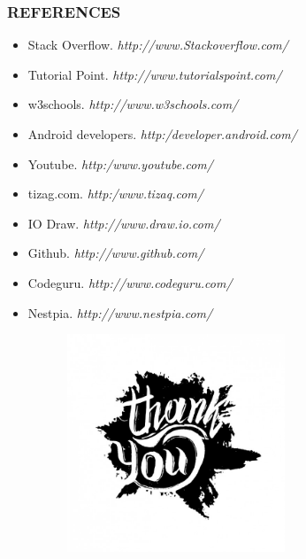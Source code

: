 \documentclass{beamer} %
\theoremstyle{definition} %
\begin{document}
\begin{frame}
\frametitle {REFERENCES}
\begin{itemize}

 \item Stack Overflow. \textit{http://www.Stackoverflow.com/}
 \item Tutorial Point. \textit{http://www.tutorialspoint.com/}
  \item w3schools.
  \textit{http://www.w3schools.com/}
   \item Android developers.
    \textit{http:/developer.android.com/}
    \item Youtube.
        \textit{http:/www.youtube.com/}
    \item tizag.com.
        \textit{http:/www.tizaq.com/}
        \item IO Draw. \textit{http://www.draw.io.com/}
        \item Github. \textit{http://www.github.com/}
        \item Codeguru. \textit{http://www.codeguru.com/}
        \item Nestpia. \textit{http://www.nestpia.com/}

	
\end{itemize}
\end{frame}



\begin{frame}
\begin{center}
\begin{figure}[center]
\includegraphics[width=8cm,height=6.5cm]{tu.jpg}
\end{figure}
\end{center}
\end{frame}
\end{document}
